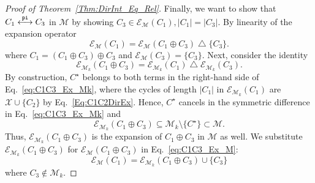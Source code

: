 \documentclass[fleqn,11pt]{article}
\newcommand\calM{\mathcal{M}}
\newcommand\calX{\mathcal{X}}     %
\newcommand\expand[2]{\mathcal{E}_{#1}\left(#2\right)}   %
\newcommand\symdiff{\mathop{\triangle}}
\newcommand\pInt{ \stackrel{\tt pi}{\longleftrightarrow} }
\begin{document}
\begin{proof}[Proof of Theorem~\ref{Thm:DirInt_Eq_Rel}]
	Finally, we want to show that $C_1\pInt C_3$ in $\calM$ by showing $C_3\in\expand{\calM}{C_1}, |C_1|=|C_3|$. By linearity of the expansion operator
	\begin{equation}
		\expand{\calM}{C_1} = \expand{\calM}{C_1\oplus C_3}\symdiff \{C_3\}.
		\label{eq:C1C3_Ex_M}
	\end{equation}
	where $C_1=(C_1\oplus C_3)\oplus C_3$ and $\expand{\calM}{C_3}=\{C_3\}$. Next, consider the identity
	\begin{equation}
		\expand{\calM_k}{C_1\oplus C_3} = \expand{\calM_k}{C_1}\symdiff \expand{\calM_k}{C_3}.
	\label{eq:C1C3_Ex_Mk}
	\end{equation}
	By construction, $C^\star$ belongs to both terms in the right-hand side of Eq.~\eqref{eq:C1C3_Ex_Mk}, where the cycles of length $|C_1|$ in $\expand{\calM_k}{C_1}$ are $\calX\cup\{C_2\}$ by Eq.~\eqref{Eq:C1C2DirEx}. Hence, $C^\star$ cancels in the symmetric difference in Eq.~\eqref{eq:C1C3_Ex_Mk} and
	\begin{equation}
		\expand{\calM_k}{C_1\oplus C_3} \subseteq \calM_k\setminus\{C^\star\} \subset \calM.
	\end{equation}
	Thus, $\expand{\calM_k}{C_1\oplus C_3}$ is the expansion of $C_1\oplus C_3$ in $\calM$ as well. We substitute $\expand{\calM_k}{C_1\oplus C_3}$ for $\expand{\calM}{C_1\oplus C_3}$ in Eq.~\eqref{eq:C1C3_Ex_M}:
	\begin{equation}
		\expand{\calM}{C_1} = \expand{\calM_k}{C_1\oplus C_3}\cup\{C_3\}
	\end{equation}
	where $C_3\notin\calM_k$.

\end{proof}
\end{document}
